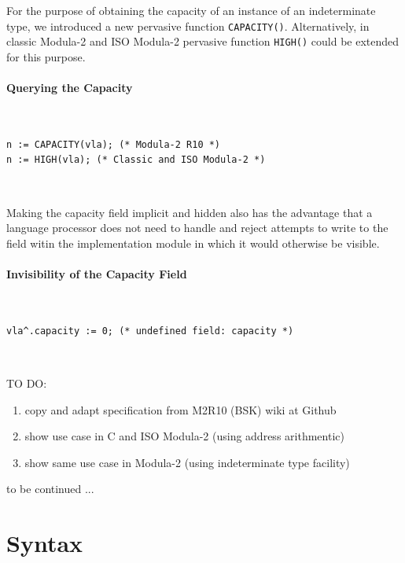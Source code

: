 \documentclass[10pt,a4paper]{article}
\newcommand\sourcecaption[1]{\noindent\normalfont\small\textsf{#1}}
\begin{document}
\par\noindent For the purpose of obtaining the capacity of an instance of an
indeterminate type, we introduced a new pervasive function
\verb|CAPACITY()|. Alternatively, in classic Modula-2 and ISO Modula-2
pervasive function \verb|HIGH()| could be extended for this purpose.

\paragraph{\sourcecaption{Querying the Capacity}}~

\lstset{style=modula2}
\begin{lstlisting}
n := CAPACITY(vla); (* Modula-2 R10 *)
n := HIGH(vla); (* Classic and ISO Modula-2 *)
\end{lstlisting}~


\par\noindent Making the capacity field implicit and hidden also has the
advantage that a language processor does not need to handle and reject
attempts to write to the field witin the implementation module in which
it would otherwise be visible.

\paragraph{\sourcecaption{Invisibility of the Capacity Field}}~

\lstset{style=modula2}
\begin{lstlisting}
vla^.capacity := 0; (* undefined field: capacity *)
\end{lstlisting}~


\noindent TO DO:

\renewcommand{\labelenumi}{(\arabic{enumi})}
\begin{enumerate}[leftmargin=!, labelindent=-0.75em, itemindent=0em]
\item copy and adapt specification from M2R10 (BSK) wiki at Github
\item show use case in C and ISO Modula-2 (using address arithmentic)
\item show same use case in Modula-2 (using indeterminate type facility)
\end{enumerate}

\noindent to be continued ...\\

\newpage

\section{Syntax}
\end{document}
